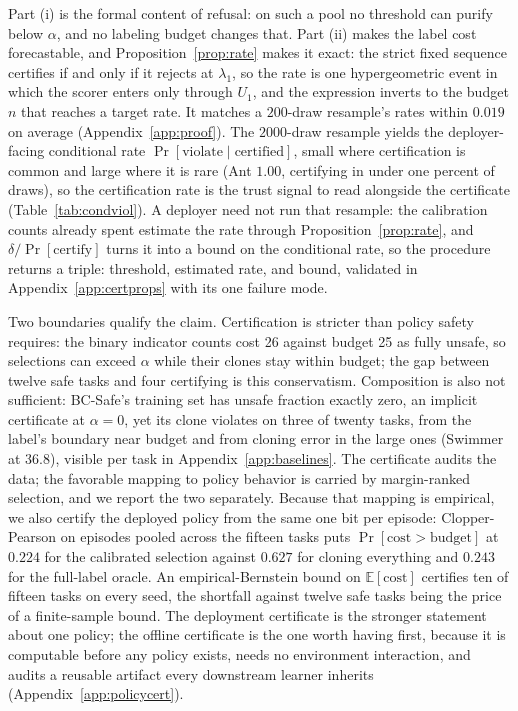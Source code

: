 \documentclass{article} %
\begin{document}
Part (i) is the formal content of refusal: on such a pool no threshold can purify below $\alpha$, and no labeling budget changes that. Part (ii) makes the label cost forecastable, and Proposition~\ref{prop:rate} makes it exact: the strict fixed sequence certifies if and only if it rejects at $\lambda_1$, so the rate is one hypergeometric event in which the scorer enters only through $U_1$, and the expression inverts to the budget $n$ that reaches a target rate. It matches a $200$-draw resample's rates within $0.019$ on average (Appendix~\ref{app:proof}). The $2000$-draw resample yields the deployer-facing conditional rate $\Pr[\text{violate} \mid \text{certified}]$, small where certification is common and large where it is rare (Ant $1.00$, certifying in under one percent of draws), so the certification rate is the trust signal to read alongside the certificate (Table~\ref{tab:condviol}). A deployer need not run that resample: the calibration counts already spent estimate the rate through Proposition~\ref{prop:rate}, and $\delta / \Pr[\text{certify}]$ turns it into a bound on the conditional rate, so the procedure returns a triple: threshold, estimated rate, and bound, validated in Appendix~\ref{app:certprops} with its one failure mode.

Two boundaries qualify the claim. Certification is stricter than policy safety requires: the binary indicator counts cost 26 against budget 25 as fully unsafe, so selections can exceed $\alpha$ while their clones stay within budget; the gap between twelve safe tasks and four certifying is this conservatism. Composition is also not sufficient: BC-Safe's training set has unsafe fraction exactly zero, an implicit certificate at $\alpha = 0$, yet its clone violates on three of twenty tasks, from the label's boundary near budget and from cloning error in the large ones (Swimmer at 36.8), visible per task in Appendix~\ref{app:baselines}. The certificate audits the data; the favorable mapping to policy behavior is carried by margin-ranked selection, and we report the two separately. Because that mapping is empirical, we also certify the deployed policy from the same one bit per episode: Clopper-Pearson on episodes pooled across the fifteen tasks puts $\Pr[\text{cost} > \text{budget}]$ at $0.224$ for the calibrated selection against $0.627$ for cloning everything and $0.243$ for the full-label oracle. An empirical-Bernstein bound on $\mathbb{E}[\text{cost}]$ certifies ten of fifteen tasks on every seed, the shortfall against twelve safe tasks being the price of a finite-sample bound. The deployment certificate is the stronger statement about one policy; the offline certificate is the one worth having first, because it is computable before any policy exists, needs no environment interaction, and audits a reusable artifact every downstream learner inherits (Appendix~\ref{app:policycert}).
\end{document}
